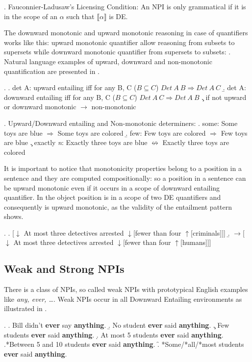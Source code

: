 \documentclass[12pt]{scrartcl}
\begin{document}
\ex. Fauconnier-Ladusaw's Licensing Condition: An NPI is only
grammatical if it is in the scope of an \(\alpha\) such that
\(\llbracket \alpha \rrbracket\) is DE.

The downward monotonic and upward monotonic reasoning in case of quantifiers works like this:  upward monotonic quantifier allow reasoning from  subsets to supersets while downward monotonic quantifier from  supersets to subsets: \Next. Natural language examples of upward, downward and non-monotonic quantification are presented in \NNext.

\ex. \a. det A: upward entailing iff for any B, C (\(B \subseteq C\))
\(Det\ A\ B \Rightarrow Det\ A\ C\) \b. det A: downward entailing iff
for any B, C (\(B \subseteq C\)) \(Det\ A\ C \Rightarrow Det\ A\ B\) \c.
if not upward or downward monotonic \(\rightarrow\) non-monotonic


\ex. Upward/Downward entailing and Non-monotonic determiners: \a. some:
Some toys are blue \(\Rightarrow\) Some toys are colored \b. few: Few
toys are colored \(\Rightarrow\) Few toys are blue \c. exactly \emph{n}:
Exactly three toys are blue \(\not\leftrightarrow\) Exactly three toys
are colored

It is important to notice that  monotonicity properties belong to a position in a sentence and they are computed compositionally: so a position in a sentence can be upward monotonic even if it occurs in a scope of downward entailing quantifier. In \Next the object position is in a scope of two DE quantifiers and consequently is upward monotonic, as the validity of the entailment pattern shows.

\ex. \a. {[}\(\downarrow\) At most three detectives arrested
\(\downarrow\){[}fewer than four \(\uparrow\){[}criminals{]}{]}{]} \b.
\(\rightarrow\){[}\(\downarrow\) At most three detectives arrested
\(\downarrow\){[}fewer than four \(\uparrow\){[}humans{]}{]}{]}

\hypertarget{weak-npis}{%
\subsection{Weak and Strong NPIs}\label{weak-npis}}

There is a class of NPIs, so called weak NPIs with prototypical English examples like  \emph{any, ever, \ldots{}}. Weak NPIs occur in all Downward Entailing environments as illustrated in \Next.

\ex. \a. Bill didn't \textbf{ever} say \textbf{anything}. \b. No student
\textbf{ever} said \textbf{anything}. \c. Few students \textbf{ever}
said \textbf{anything}. \d. At most 5 students \textbf{ever} said
\textbf{anything}. \e.*Between 5 and 10 students \textbf{ever} said
\textbf{anything}. \f. *Some/*all/*most students \textbf{ever} said
\textbf{anything}.
\end{document}
